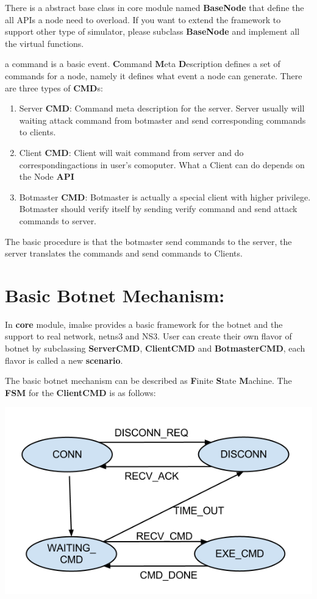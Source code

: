 \documentclass[letterpaper,10pt,english]{sphinxmanual}
\begin{document}
There is a abstract base class in core module named \textbf{BaseNode} that define the
all APIs a node need to overload. If you want to extend the framework to support
other type of simulator, please subclass \textbf{BaseNode} and implement all the
virtual functions.

a command is a basic event. \textbf{C}ommand \textbf{M}eta \textbf{D}escription defines a
set of commands for a node, namely it defines what event a node can generate.
There are three types of \textbf{CMD}s:
\begin{enumerate}
\item {} 
Server \textbf{CMD}: Command meta description for the server. Server usually
will waiting attack command from botmaster and send corresponding commands to
clients.

\item {} 
Client \textbf{CMD}: Client will wait command from server and do
correspondingactions in user's comoputer. What a Client can do depends on
the Node \textbf{API}

\item {} 
Botmaster \textbf{CMD}: Botmaster is actually a special client with higher
privilege. Botmaster should verify itself by sending verify command and
send attack commands to server.

\end{enumerate}

The basic procedure is that the botmaster send commands to the server, the server
translates the commands and send commands to Clients.


\section{Basic Botnet Mechanism:}
\label{index:basic-botnet-mechanism}
In \textbf{core} module, imalse provides a basic framework for the botnet and the
support to real network, netns3 and NS3. User can create their own flavor of
botnet by subclassing \textbf{ServerCMD}, \textbf{ClientCMD} and \textbf{BotmasterCMD}, each
flavor is called a new \textbf{scenario}.

The basic botnet mechanism can be described as \textbf{F}inite \textbf{S}tate \textbf{M}achine. The \textbf{FSM} for the \textbf{ClientCMD} is as follows:

{\hfill\includegraphics{client_fsm.png}\hfill}
\end{document}
